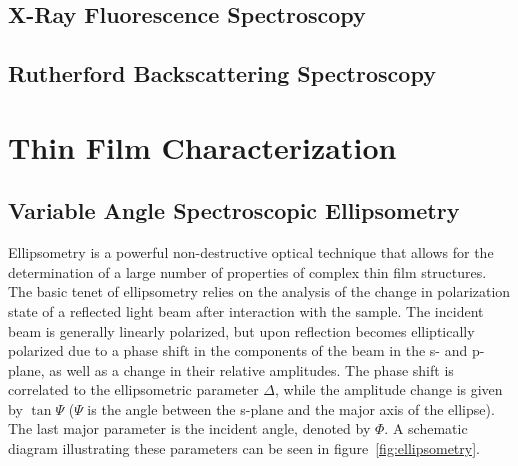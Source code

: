 \subsection{X-Ray Fluorescence Spectroscopy}

\lipsum


\subsection{Rutherford Backscattering Spectroscopy}

\lipsum


\section{Thin Film Characterization}


	
\subsection{Variable Angle Spectroscopic Ellipsometry}

Ellipsometry is a powerful non-destructive optical technique that allows for the determination of a large number of properties of complex thin film structures. The basic tenet of ellipsometry relies on the analysis of the change in polarization state of a reflected light beam after interaction with the sample. The incident beam is generally linearly polarized, but upon reflection becomes elliptically polarized due to a phase shift in the components of the beam in the s- and p-plane, as well as a change in their relative amplitudes. The phase shift is correlated to the ellipsometric parameter $\Delta$, while the amplitude change is given by $\tan\Psi$ ($\Psi$ is the angle between the s-plane and the major axis of the ellipse). The last major parameter is the incident angle, denoted by $\Phi$. A schematic diagram illustrating these parameters can be seen in figure~\ref{fig:ellipsometry}. 

